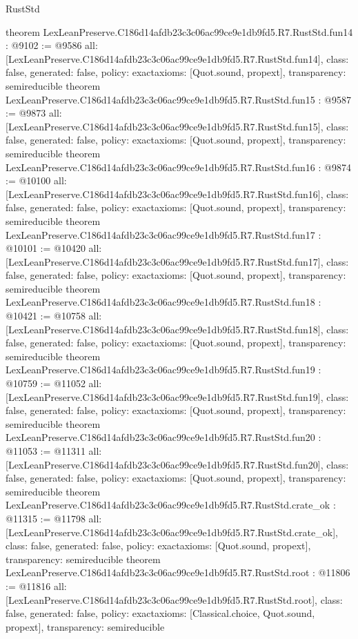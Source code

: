 \begin{lexlean}{RustStd}
\begin{coremodule}
{}
theorem LexLeanPreserve.C186d14afdb23c3c06ac99ce9e1db9fd5.R7.RustStd.fun14 : @9102 := @9586 {
  all: [LexLeanPreserve.C186d14afdb23c3c06ac99ce9e1db9fd5.R7.RustStd.fun14],
  class: false,
  generated: false,
  policy: exact{axioms: [Quot.sound, propext]},
  transparency: semireducible
}
theorem LexLeanPreserve.C186d14afdb23c3c06ac99ce9e1db9fd5.R7.RustStd.fun15 : @9587 := @9873 {
  all: [LexLeanPreserve.C186d14afdb23c3c06ac99ce9e1db9fd5.R7.RustStd.fun15],
  class: false,
  generated: false,
  policy: exact{axioms: [Quot.sound, propext]},
  transparency: semireducible
}
theorem LexLeanPreserve.C186d14afdb23c3c06ac99ce9e1db9fd5.R7.RustStd.fun16 : @9874 := @10100 {
  all: [LexLeanPreserve.C186d14afdb23c3c06ac99ce9e1db9fd5.R7.RustStd.fun16],
  class: false,
  generated: false,
  policy: exact{axioms: [Quot.sound, propext]},
  transparency: semireducible
}
theorem LexLeanPreserve.C186d14afdb23c3c06ac99ce9e1db9fd5.R7.RustStd.fun17 : @10101 := @10420 {
  all: [LexLeanPreserve.C186d14afdb23c3c06ac99ce9e1db9fd5.R7.RustStd.fun17],
  class: false,
  generated: false,
  policy: exact{axioms: [Quot.sound, propext]},
  transparency: semireducible
}
theorem LexLeanPreserve.C186d14afdb23c3c06ac99ce9e1db9fd5.R7.RustStd.fun18 : @10421 := @10758 {
  all: [LexLeanPreserve.C186d14afdb23c3c06ac99ce9e1db9fd5.R7.RustStd.fun18],
  class: false,
  generated: false,
  policy: exact{axioms: [Quot.sound, propext]},
  transparency: semireducible
}
theorem LexLeanPreserve.C186d14afdb23c3c06ac99ce9e1db9fd5.R7.RustStd.fun19 : @10759 := @11052 {
  all: [LexLeanPreserve.C186d14afdb23c3c06ac99ce9e1db9fd5.R7.RustStd.fun19],
  class: false,
  generated: false,
  policy: exact{axioms: [Quot.sound, propext]},
  transparency: semireducible
}
theorem LexLeanPreserve.C186d14afdb23c3c06ac99ce9e1db9fd5.R7.RustStd.fun20 : @11053 := @11311 {
  all: [LexLeanPreserve.C186d14afdb23c3c06ac99ce9e1db9fd5.R7.RustStd.fun20],
  class: false,
  generated: false,
  policy: exact{axioms: [Quot.sound, propext]},
  transparency: semireducible
}
theorem LexLeanPreserve.C186d14afdb23c3c06ac99ce9e1db9fd5.R7.RustStd.crate_ok : @11315 := @11798 {
  all: [LexLeanPreserve.C186d14afdb23c3c06ac99ce9e1db9fd5.R7.RustStd.crate_ok],
  class: false,
  generated: false,
  policy: exact{axioms: [Quot.sound, propext]},
  transparency: semireducible
}
theorem LexLeanPreserve.C186d14afdb23c3c06ac99ce9e1db9fd5.R7.RustStd.root : @11806 := @11816 {
  all: [LexLeanPreserve.C186d14afdb23c3c06ac99ce9e1db9fd5.R7.RustStd.root],
  class: false,
  generated: false,
  policy: exact{axioms: [Classical.choice, Quot.sound, propext]},
  transparency: semireducible
}


\end{coremodule}
\end{lexlean}
